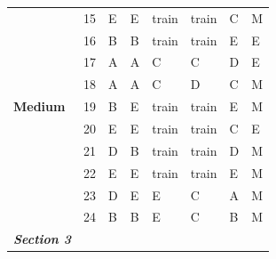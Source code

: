\documentclass[pageno]{jpaper}
\newcommand{\textbi}[1]{\textbf{\textit{#1}}}
\begin{document}
\begin{table}[]
\begin{tabular}{llllllll}
\textbf{}                & 15              & E                       & E                      & train                   & train                   & C                       & M                   \\
\textbf{}                & 16              & B                       & B                      & train                   & train                   & E                       & E                   \\
\textbf{}                & 17              & A                       & A                      & C                       & C                       & D                       & E                   \\
\textbf{}                & 18              & A                       & A                      & C                       & D                       & C                       & M                   \\
\textbf{Medium}          & 19              & B                       & E                      & train                   & train                   & E                       & M                   \\
\textbf{}                & 20              & E                       & E                      & train                   & train                   & C                       & E                   \\
\textbf{}                & 21              & D                       & B                      & train                   & train                   & D                       & M                   \\
\textbf{}                & 22              & E                       & E                      & train                   & train                   & E                       & M                   \\
\textbf{}                & 23              & D                       & E                      & E                       & C                       & A                       & M                   \\
\textbf{}                & 24              & B                       & B                      & E                       & C                       & B                       & M                   \\ \midrule
\textbi{Section 3}       &                 &                         &                        &                         &                         &                         &                     \\ \midrule

\end{tabular}
\end{table}
\end{document}

